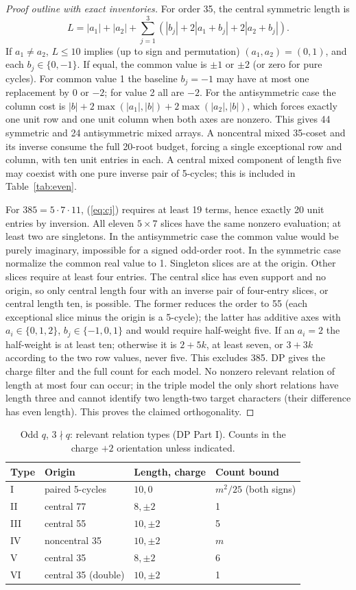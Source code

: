 \documentclass[11pt]{article}
\begin{document}
\begin{proof}[Proof outline with exact inventories]
For order 35, the central symmetric length is
\[L=|a_1|+|a_2|+\sum_{j=1}^3(|b_j|+2|a_1+b_j|+2|a_2+b_j|).\]
If $a_1\ne a_2$, $L\le10$ implies (up to sign and permutation) $(a_1,a_2)=(0,1)$, and each $b_j\in\{0,-1\}$. If equal, the common value is $\pm1$ or $\pm2$ (or zero for pure cycles). For common value 1 the baseline $b_j=-1$ may have at most one replacement by 0 or $-2$; for value 2 all are $-2$. For the antisymmetric case the column cost is $|b|+2\max(|a_1|,|b|)+2\max(|a_2|,|b|)$, which forces exactly one unit row and one unit column when both axes are nonzero. This gives 44 symmetric and 24 antisymmetric mixed arrays. A noncentral mixed 35-coset and its inverse consume the full 20-root budget, forcing a single exceptional row and column, with ten unit entries in each. A central mixed component of length five may coexist with one pure inverse pair of 5-cycles; this is included in Table~\ref{tab:even}.

For $385=5\cdot7\cdot11$, (\ref{eq:cj}) requires at least 19 terms, hence exactly 20 unit entries by inversion. All eleven $5\times7$ slices have the same nonzero evaluation; at least two are singletons. In the antisymmetric case the common value would be purely imaginary, impossible for a signed odd-order root. In the symmetric case normalize the common real value to 1. Singleton slices are at the origin. Other slices require at least four entries. The central slice has even support and no origin, so only central length four with an inverse pair of four-entry slices, or central length ten, is possible. The former reduces the order to 55 (each exceptional slice minus the origin is a 5-cycle); the latter has additive axes with $a_i\in\{0,1,2\}$, $b_j\in\{-1,0,1\}$ and would require half-weight five. If an $a_i=2$ the half-weight is at least ten; otherwise it is $2+5k$, at least seven, or $3+3k$ according to the two row values, never five. This excludes 385. DP gives the charge filter and the full count for each model. No nonzero relevant relation of length at most four can occur; in the triple model the only short relations have length three and cannot identify two length-two target characters (their difference has even length). This proves the claimed orthogonality.
\end{proof}
\begin{table}[ht]\centering\small\caption{Odd $q$, $3\nmid q$: relevant relation types (DP Part I). Counts in the charge $+2$ orientation unless indicated.}\label{tab:odd}\begin{tabular}{llll}\toprule Type & Origin & Length, charge & Count bound\\\midrule I & paired 5-cycles & $10,0$ & $m^2/25$ (both signs)\\II & central 77 & $8,\pm2$ & 1\\III & central 55 & $10,\pm2$ & 5\\IV & noncentral 35 & $10,\pm2$ & $m$\\V & central 35 & $8,\pm2$ & 6\\VI & central 35 (double) & $10,\pm2$ & 1\\\bottomrule\end{tabular}\end{table}
\end{document}
